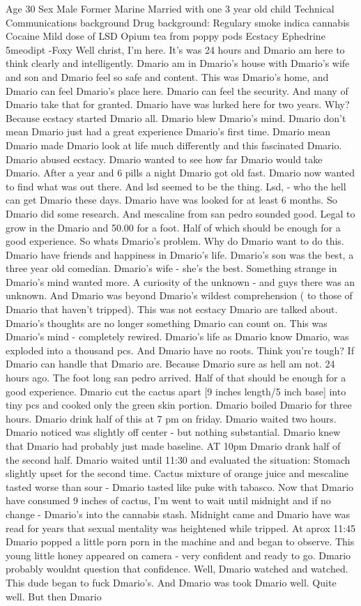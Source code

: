 \documentclass[12pt]{book}
\begin{document}
Age 30 Sex Male Former Marine Married with one 3 year old child Technical Communications background Drug background: Regulary smoke indica cannabis Cocaine Mild dose of LSD Opium tea from poppy pods Ecstacy Ephedrine 5meodipt -Foxy Well christ, I'm here. It's was 24 hours and Dmario am here to think clearly and intelligently. Dmario am in Dmario's house with Dmario's wife and son and Dmario feel so safe and content. This was Dmario's home, and Dmario can feel Dmario's place here. Dmario can feel the security. And many of Dmario take that for granted. Dmario have was lurked here for two years. Why? Because ecstacy started Dmario all. Dmario blew Dmario's mind. Dmario don't mean Dmario just had a great experience Dmario's first time. Dmario mean Dmario made Dmario look at life much differently and this fascinated Dmario. Dmario abused ecstacy. Dmario wanted to see how far Dmario would take Dmario. After a year and 6 pills a night Dmario got old fast. Dmario now wanted to find what was out there. And lsd seemed to be the thing. Lsd, - who the hell can get Dmario these days. Dmario have was looked for at least 6 months. So Dmario did some research. And mescaline from san pedro sounded good. Legal to grow in the Dmario and 50.00 for a foot. Half of which should be enough for a good experience. So whats Dmario's problem. Why do Dmario want to do this. Dmario have friends and happiness in Dmario's life. Dmario's son was the best, a three year old comedian. Dmario's wife - she's the best. Something strange in Dmario's mind wanted more. A curiosity of the unknown - and guys there was an unknown. And Dmario was beyond Dmario's wildest comprehension ( to those of Dmario that haven't tripped). This was not ecstacy Dmario are talked about. Dmario's thoughts are no longer something Dmario can count on. This was Dmario's mind - completely rewired. Dmario's life as Dmario know Dmario, was exploded into a thousand pcs. And Dmario have no roots. Think you're tough? If Dmario can handle that Dmario are. Because Dmario sure as hell am not. 24 hours ago. The foot long san pedro arrived. Half of that should be enough for a good experience. Dmario cut the cactus apart [9 inches length/5 inch base] into tiny pcs and cooked only the green skin portion. Dmario boiled Dmario for three hours. Dmario drink half of this at 7 pm on friday. Dmario waited two hours. Dmario noticed was slightly off center - but nothing substantial. Dmario knew that Dmario had probably just made baseline. AT 10pm Dmario drank half of the second half. Dmario waited until 11:30 and evaluated the situation: Stomach slightly upset for the second time. Cactus mixture of orange juice and mescaline tasted worse than sour - Dmario tasted like puke with tabasco. Now that Dmario have consumed 9 inches of cactus, I'm went to wait until midnight and if no change - Dmario's into the cannabis stash. Midnight came and Dmario have was read for years that sexual mentality was heightened while tripped. At aprox 11:45 Dmario popped a little porn porn in the machine and and began to observe. This young little honey appeared on camera - very confident and ready to go. Dmario probably wouldnt question that confidence. Well, Dmario watched and watched. This dude began to fuck Dmario's. And Dmario was took Dmario well. Quite well. But then Dmario 
\end{document}
